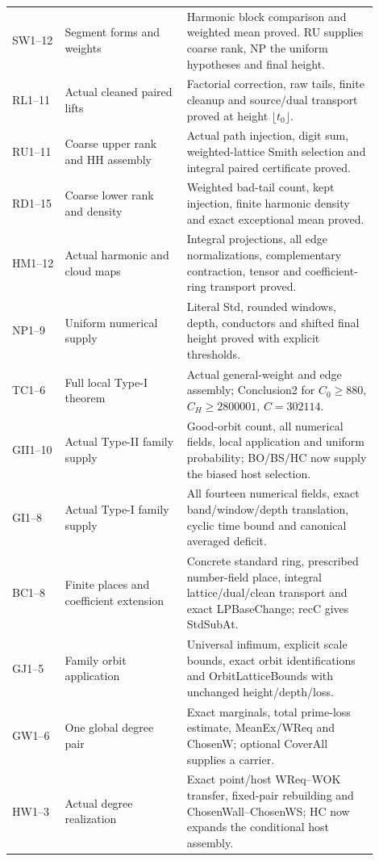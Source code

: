 \documentclass[11pt,a4paper]{article}
\numberwithin{equation}{section}
\theoremstyle{remark}\newtheorem{remark}[theorem]{Remark}
\begin{document}
\begin{longtable}{>{\raggedright\arraybackslash}p{0.13\linewidth}>{\raggedright\arraybackslash}p{0.30\linewidth}>{\raggedright\arraybackslash}p{0.47\linewidth}}
SW1--12 & Segment forms and weights & Harmonic block comparison and weighted mean proved. RU supplies coarse rank, NP the uniform hypotheses and final height.\\[3pt]
RL1--11 & Actual cleaned paired lifts & Factorial correction, raw tails, finite cleanup and source/dual transport proved at height $\lfloor t_0\rfloor$.\\[3pt]
RU1--11 & Coarse upper rank and HH assembly & Actual path injection, digit sum, weighted-lattice Smith selection and integral paired certificate proved.\\[3pt]
RD1--15 & Coarse lower rank and density & Weighted bad-tail count, kept injection, finite harmonic density and exact exceptional mean proved.\\[3pt]
HM1--12 & Actual harmonic and cloud maps & Integral projections, all edge normalizations, complementary contraction, tensor and coefficient-ring transport proved.\\[3pt]
NP1--9 & Uniform numerical supply & Literal Std, rounded windows, depth, conductors and shifted final height proved with explicit thresholds.\\[3pt]
TC1--6 & Full local Type-I theorem & Actual general-weight and edge assembly; Conclusion2 for $C_0\ge880$, $C_H\ge2800001$, $C=302114$.\\[3pt]
GII1--10 & Actual Type-II family supply & Good-orbit count, all numerical fields, local application and uniform probability; BO/BS/HC now supply the biased host selection.\\[3pt]
GI1--8 & Actual Type-I family supply & All fourteen numerical fields, exact band/window/depth translation, cyclic time bound and canonical averaged deficit.\\[3pt]
BC1--8 & Finite places and coefficient extension & Concrete standard ring, prescribed number-field place, integral lattice/dual/clean transport and exact LPBaseChange; recC gives StdSubAt.\\[3pt]
GJ1--5 & Family orbit application & Universal infimum, explicit scale bounds, exact orbit identifications and OrbitLatticeBounds with unchanged height/depth/loss.\\[3pt]
GW1--6 & One global degree pair & Exact marginals, total prime-loss estimate, MeanEx/WReq and ChosenW; optional CoverAll supplies a carrier.\\[3pt]
HW1--3 & Actual degree realization & Exact point/host WReq--WOK transfer, fixed-pair rebuilding and ChosenWall--ChosenWS; HC now expands the conditional host assembly.\\[3pt]

\end{longtable}
\end{document}
